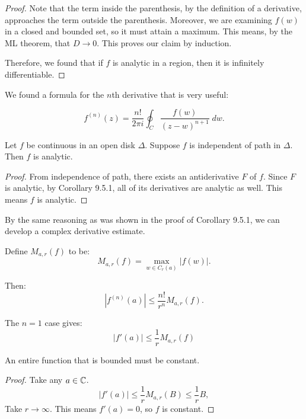 \begin{proof}
    Note that the term inside the parenthesis, by the definition of a derivative, approaches the term outside the parenthesis.
    Moreover, we are examining $f(w)$ in a closed and bounded set, so it must attain a maximum.
    This means, by the ML theorem, that $D \to 0$.
    This proves our claim by induction.

    Therefore, we found that if $f$ is analytic in a region, then it is infinitely differentiable.


\end{proof}

We found a formula for the $n$th derivative that is very useful:
\begin{theorem}
    \[ f^{(n)} (z) = \frac{n!}{2\pi i} \oint_{C} \frac{f(w)}{(z-w)^{n+1}} \; dw. \]
\end{theorem}

\begin{theorem}
    Let $f$ be continuous in an open disk $\Delta$.
    Suppose $f$ is independent of path in $\Delta$.
    Then $f$ is analytic.
\end{theorem}

\begin{proof}
    From independence of path, there exists an antiderivative $F$ of $f$.
    Since $F$ is analytic, by Corollary 9.5.1, all of its derivatives are analytic as well.
    This means $f$ is analytic.
\end{proof}

By the same reasoning as was shown in the proof of Corollary 9.5.1, we can develop a complex derivative estimate.
\begin{definition}
    Define $M_{a,r} (f)$ to be:
    \[ M_{a,r}(f) = \max_{w \in C_r(a)} |f(w)|.\]
\end{definition}

Then:
\[ |f^{(n)}(a)| \le \frac{n!}{r^n} M_{a,r}(f). \]

\begin{cor}
    The $n = 1$ case gives:
    \[ |f'(a) | \le \frac{1}{r} M_{a,r}(f) \]
\end{cor}

\begin{cor}
    An entire function that is bounded must be constant.
\end{cor}

\begin{proof}
    Take any $a \in \operatorname{\mathbb{C}}$.
    \[ |f'(a)| \le \frac{1}{r} M_{a,r}(B) \le \frac{1}{r}B, \]
    Take $r \to \infty$.
    This means $f'(a) = 0$, so $f$ is constant.
\end{proof}

